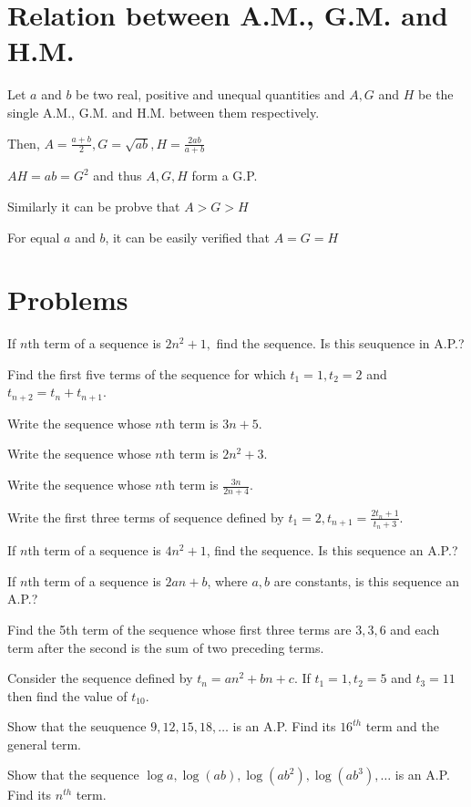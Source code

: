 \section{Relation between A.M., G.M. and H.M.}
Let $a$ and $b$ be two real, positive and unequal quantities and $A, G$ and $H$ be the single A.M., G.M. and H.M. between them
respectively.

Then, $A = \frac{a + b}{2}, G = \sqrt{ab}, H = \frac{2ab}{a + b}$

$AH = ab = G^2$ and thus $A, G, H$ form a G.P.

Similarly it can be probve that $A > G > H$

For equal $a$ and $b$, it can be easily verified that $A = G = H$

\section{Problems}
\startitemize[n, 1*broad]
\item If $n$th term of a sequence is $2n^2 + 1,$ find the sequence. Is this seuquence in A.P.?
\item Find the first five terms of the sequence for which $t_1 = 1, t_2 = 2$ and $t_{n + 2} = t_n + t_{n + 1}$.
\item Write the sequence whose $n$th term is $3n + 5$.
\item Write the sequence whose $n$th term is $2n^2 + 3$.
\item Write the sequence whose $n$th term is $\frac{3n}{2n + 4}$.
\item Write the first three terms of sequence defined by $t_1 = 2, t_{n + 1} = \frac{2t_n + 1}{t_n + 3}$.
\item If $n$th term of a sequence is $4n^2 + 1$, find the sequence. Is this sequence an A.P.?
\item If $n$th term of a sequence is $2an + b$, where $a, b$ are constants, is this sequence an A.P.?
\item Find the 5th term of the sequence whose first three terms are $3, 3, 6$ and each term after the second is the sum of two
  preceding terms.
\item Consider the sequence defined by $t_n = an^2 + bn + c$. If $t_1 = 1, t_2 = 5$ and $t_3 = 11$ then find the value of
  $t_{10}$.
\item Show that the seuquence $9, 12, 15, 18, \ldots$ is an A.P. Find its $16^{th}$ term and the general term.
\item Show that the sequence $\log a, \log (ab), \log(ab^2), \log (ab^3), \ldots$ is an A.P. Find its $n^{th}$ term.
